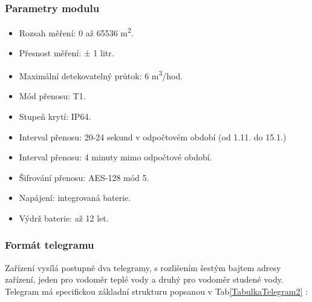 \subsubsection{Parametry modulu}
\begin{itemize}
	\item Rozsah měření: 0 až 65536 m\textsuperscript{2}.
	\item Přesnost měření: ± 1 litr.
	\item Maximální detekovatelný průtok: 6 m\textsuperscript{3}/hod.
	\item Mód přenosu: T1.
	\item Stupeň krytí: IP64.
	\item Interval přenosu: 20-24 sekund v odpočtovém období (od 1.11. do 15.1.)
	\item Interval přenosu: 4 minuty mimo odpočtové období.
	\item Šifrování přenosu: AES-128 mód 5.
	\item Napájení: integrovaná baterie.
	\item Výdrž baterie: až 12 let.
\end{itemize}


\subsubsection{Formát telegramu}
Zařízení vysílá postupně dva telegramy, s rozlišením šestým bajtem adresy zařízení, jeden pro vodoměr teplé vody a druhý pro vodoměr studené vody.
Telegram má specifickou základní strukturu popsanou v Tab\ref{TabulkaTelegram2} \cite{BonegaCidlo}:


